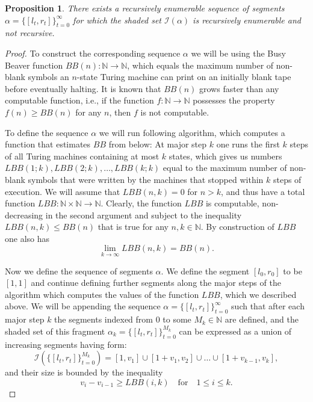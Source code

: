\documentclass[12pt,a4paper]{amsart}
\newtheorem{prop}{Proposition}
\begin{document}
\begin{prop}
\label{prop-shaded-set}
There exists a recursively enumerable sequence of segments $\alpha=\{[l_t,r_t]\}_{t=0}^\infty$ for which the shaded set $\mathcal I(\alpha)$ is recursively enumerable and not recursive.
\end{prop}
\begin{proof}
To construct the corresponding sequence $\alpha$ we will be using the Busy Beaver function $BB(n):\mathbb N\to \mathbb N$, which equals the maximum number of non-blank symbols an $n$-state Turing machine can print on an initially blank tape before eventually halting. It is known that $BB(n)$ grows faster than any computable function, i.e., if the function $f:\mathbb N\to \mathbb N$ possesses the property $f(n)\geq BB(n)$ for any $n$, then $f$ is not computable.

To define the sequence $\alpha$ we will run following algorithm, which computes a function that estimates $BB$ from below: At major step $k$ one runs the first $k$ steps of all Turing machines containing at most $k$ states, which gives us numbers $LBB(1;k), LBB(2;k), \ldots, LBB(k;k)$ equal to the maximum number of non-blank symbols that were written by the machines that stopped within $k$ steps of execution. We will assume that $LBB(n,k)=0$ for $n>k$, and thus have a total function $LBB:\mathbb N\times \mathbb N\to \mathbb N$. Clearly, the function $LBB$ is computable, non-decreasing in the second argument and subject to the inequality $LBB(n,k)\leq BB(n)$ that is true for any $n,k\in \mathbb N$. By construction of $LBB$ one also has
\begin{equation}
\label{lim_inequality}
\lim_{k\to\infty} LBB(n,k) = BB(n).
\end{equation}

Now we define the sequence of segments $\alpha$. We define the segment $[l_0,r_0]$ to be $[1,1]$ and continue defining further segments along the major steps of the algorithm which computes the values of the function $LBB$, which we described above. We will be appending the sequence $\alpha=\{[l_t,r_t]\}_{t=0}^\infty$ such that after each major step $k$ the segments indexed from $0$ to some $M_k\in \mathbb N$ are defined, and the shaded set of this fragment $\alpha_k=\{[l_t,r_t]\}_{t=0}^{M_k}$ can be expressed as a union of increasing segments having form:
\begin{equation}
\label{invariant}
\mathcal I(\{[l_t,r_t]\}_{t=0}^{M_k})=[1,v_1]\cup[1+v_1,v_2]\cup\ldots \cup [1+v_{k-1},v_k],
\end{equation}
and their size is bounded by the inequality
\begin{equation}
\label{inv_inequality}
    v_i-v_{i-1}\geq LBB(i,k) \quad \text{for} \quad 1\leq i\leq k.
\end{equation}


\end{proof}
\end{document}
